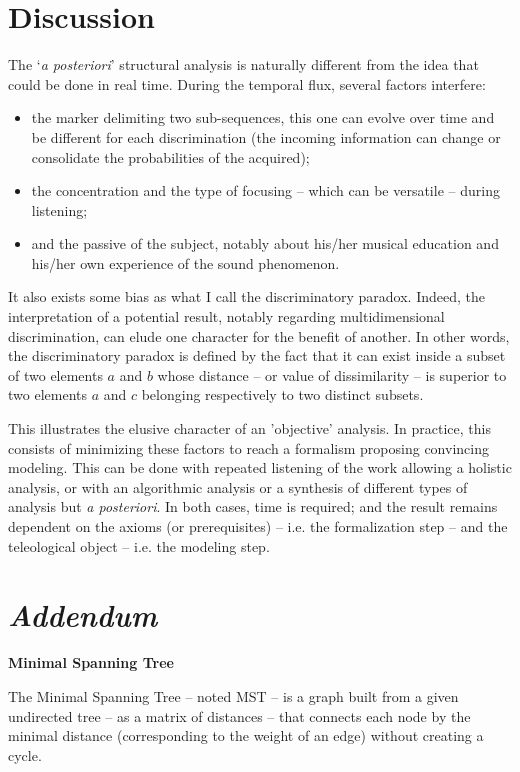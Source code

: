 \section{Discussion}
The `\textit{a posteriori}' structural analysis is naturally different from the idea that could be done in real time. During the temporal flux, several factors interfere:
\begin{itemize}
  \item the marker delimiting two sub-sequences, this one can evolve over time and be different for each discrimination (the incoming information can change or consolidate the probabilities of the acquired);
  \item the concentration and the type of focusing -- which can be versatile -- during listening;
  \item and the passive of the subject, notably about his/her musical education and his/her own experience of the sound phenomenon.
\end{itemize}

It also exists some bias as what I call the discriminatory paradox. Indeed, the interpretation of a potential result, notably regarding multidimensional discrimination, can elude one character for the benefit of another. In other words, the discriminatory paradox is defined by the fact that it can exist inside a subset of two elements $a$ and $b$ whose distance -- or value of dissimilarity -- is superior to two elements $a$ and $c$ belonging respectively to two distinct subsets.

\bigskip

This illustrates the elusive character of an 'objective' analysis. In practice, this consists of minimizing these factors to reach a formalism proposing convincing modeling. This can be done with repeated listening of the work allowing a holistic analysis, or with an algorithmic analysis or a synthesis of different types of analysis but \textit{a posteriori}. In both cases, time is required; and the result remains dependent on the axioms (or prerequisites) -- i.e. the formalization step -- and the teleological object -- i.e. the modeling step.

\section{\textit{Addendum}}
\label{amst}

\textbf{Minimal Spanning Tree}
\smallskip

The Minimal Spanning Tree -- noted MST -- is a graph built from a given undirected tree -- as a matrix of distances -- that connects each node by the minimal distance (corresponding to the weight of an edge) without creating a cycle. 


